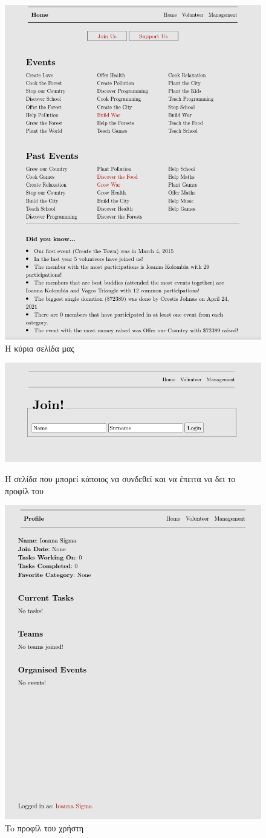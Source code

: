 \documentclass[manuscript,screen,review]{acmart}
\begin{document}
\begin{figure}[H]
    \centering
    \includegraphics[width=.5\textwidth]{./images/homepage.png}
    \caption{H κύρια σελίδα μας}
    
    
\end{figure}

\begin{figure}[H]
   
    \centering
    \includegraphics[width=.5\textwidth]{./images/join.png}
    \caption{Η σελίδα που μπορεί κάποιος να συνδεθεί και να έπειτα να δει το προφίλ του}
    \centering
    \includegraphics[width=.5\textwidth]{./images/profile.png}
    \caption{To προφίλ του χρήστη}
    
    
\end{figure}
\end{document}
